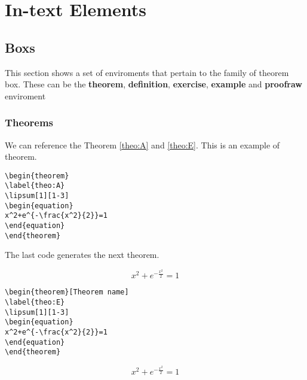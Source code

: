\chapter{In-text Elements}

\section{Boxs}

This section shows a set of enviroments that pertain to the family of theorem box.
These can be the 
\textbf{theorem}, 
\textbf{definition}, 
\textbf{exercise}, 
\textbf{example} and 
\textbf{proofraw} enviroment 

\subsection{Theorems}

We can reference the Theorem \ref{theo:A} and \ref{theo:E}.
This is an example of theorem.
\begin{highlightbox}
\begin{verbatim}
\begin{theorem}
\label{theo:A}
\lipsum[1][1-3]
\begin{equation}
x^2+e^{-\frac{x^2}{2}}=1
\end{equation}
\end{theorem}
\end{verbatim}
\end{highlightbox}

The last code generates the next theorem.
\begin{theorem}
\label{theo:A}
\lipsum[1][1-3]
\begin{equation}
x^2+e^{-\frac{x^2}{2}}=1
\end{equation}
\end{theorem}



\begin{highlightbox}
\begin{verbatim}
\begin{theorem}[Theorem name]
\label{theo:E}
\lipsum[1][1-3]
\begin{equation}
x^2+e^{-\frac{x^2}{2}}=1
\end{equation}
\end{theorem}
\end{verbatim}
\end{highlightbox}
\begin{theorem}
\label{theo:E}
\lipsum[1][1-3]
\begin{equation}
x^2+e^{-\frac{x^2}{2}}=1
\end{equation}
\end{theorem}


